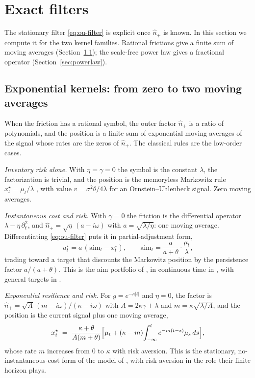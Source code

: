 \documentclass[11pt]{article}
\theoremstyle{plain}
\theoremstyle{definition}
\theoremstyle{remark}
\begin{document}
\section{Exact filters}\label{sec:filters}

The stationary filter \eqref{eq:ou-filter} is explicit once $\hat n_+$ is known. In this section we compute it for the two kernel families. Rational frictions give a finite sum of moving averages (Section~\ref{sec:rational}); the scale-free power law gives a fractional operator (Section~\ref{sec:powerlaw}).

\subsection{Exponential kernels: from zero to two moving averages}\label{sec:rational}

When the friction has a rational symbol, the outer factor $\hat n_+$ is a ratio of polynomials, and the position is a finite sum of exponential moving averages of the signal whose rates are the zeros of $\hat n_+$. The classical rules are the low-order cases.

\emph{Inventory risk alone.} With $\eta=\gamma=0$ the symbol is the constant $\lambda$, the factorization is trivial, and the position is the memoryless Markowitz rule $x^\star_t=\mu_t/\lambda$ \citep{Markowitz1952,Merton1971}, with value $v=\sigma^2\theta/4\lambda$ for an Ornstein--Uhlenbeck signal. Zero moving averages.

\emph{Instantaneous cost and risk.} With $\gamma=0$ the friction is the differential operator $\lambda-\eta\,\partial_t^2$, and $\hat n_+=\sqrt\eta\,(a-i\omega)$ with $a=\sqrt{\lambda/\eta}$: one moving average. Differentiating \eqref{eq:ou-filter} puts it in partial-adjustment form,
\begin{equation}\label{eq:gp}
u^\star_t = a\,(\mathrm{aim}_t-x^\star_t), \qquad
\mathrm{aim}_t = \frac{a}{a+\theta}\cdot\frac{\mu_t}{\lambda},
\end{equation}
trading toward a target that discounts the Markowitz position by the persistence factor $a/(a+\theta)$. This is the aim portfolio of \citet{GarleanuPedersen2013}, in continuous time in \citet{GarleanuPedersen2016}, with general targets in \citet{BankSonerVoss2017}.

\emph{Exponential resilience and risk.} For $g=e^{-\kappa|t|}$ and $\eta=0$, the factor is $\hat n_+=\sqrt A\,(m-i\omega)/(\kappa-i\omega)$ with $A=2\kappa\gamma+\lambda$ and $m=\kappa\sqrt{\lambda/A}$, and the position is the current signal plus one moving average,
\begin{equation}\label{eq:ema}
x^\star_t \;=\; \frac{\kappa+\theta}{A(m+\theta)}\Bigl[\mu_t + (\kappa-m)\!\int_{-\infty}^t e^{-m(t-s)}\mu_s\,ds\Bigr],
\end{equation}
whose rate $m$ increases from $0$ to $\kappa$ with risk aversion. This is the stationary, no-instantaneous-cost form of the model of \citet{LehalleNeuman2019}, with risk aversion in the role their finite horizon plays.
\end{document}
